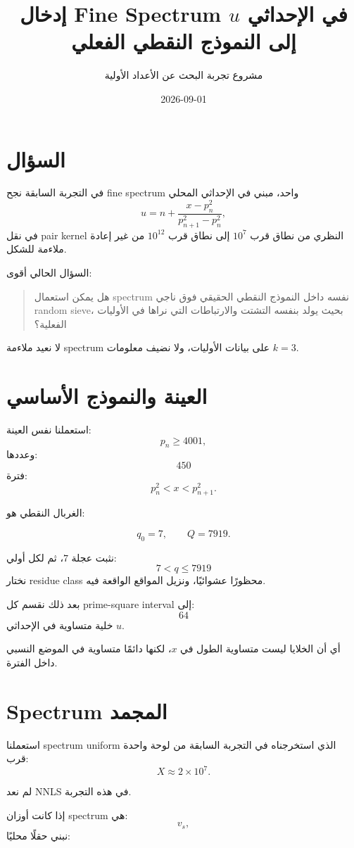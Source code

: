 \documentclass[12pt]{article}
\title{إدخال Fine Spectrum في الإحداثي \(u\) إلى النموذج النقطي الفعلي}
\author{مشروع تجربة البحث عن الأعداد الأولية}
\date{2026-09-01}
\begin{document}
\maketitle

\section{السؤال}

في التجربة السابقة نجح fine spectrum واحد، مبني في الإحداثي المحلي
\[
u
=
n+
\frac{x-p_n^2}
{p_{n+1}^2-p_n^2},
\]
في نقل pair kernel النظري من نطاق قرب \(10^7\) إلى نطاق قرب \(10^{12}\)
من غير إعادة ملاءمة للشكل.

السؤال الحالي أقوى:

\begin{quote}
هل يمكن استعمال spectrum نفسه داخل النموذج النقطي الحقيقي فوق ناجي
random sieve، بحيث يولد بنفسه التشتت والارتباطات التي نراها في
الأوليات الفعلية؟
\end{quote}

لا نعيد ملاءمة spectrum على بيانات الأوليات، ولا نضيف معلومات \(k=3\).

\section{العينة والنموذج الأساسي}

استعملنا نفس العينة:
\[
p_n\ge4001,
\]
وعددها:
\[
450
\]
فترة:
\[
p_n^2<x<p_{n+1}^2.
\]

الغربال النقطي هو:

\[
q_0=7,
\qquad
Q=7919.
\]

نثبت عجلة \(7\)، ثم لكل أولي:
\[
7<q\le7919
\]
نختار residue class محظورًا عشوائيًا، ونزيل المواقع الواقعة فيه.

بعد ذلك نقسم كل prime-square interval إلى:
\[
64
\]
خلية متساوية في الإحداثي \(u\).

أي أن الخلايا ليست متساوية الطول في \(x\)، لكنها دائمًا متساوية في
الموضع النسبي داخل الفترة.

\section{Spectrum المجمد}

استعملنا spectrum uniform الذي استخرجناه في التجربة السابقة من لوحة واحدة
قرب:
\[
X\approx2\times10^7.
\]

لم نعد NNLS في هذه التجربة.

إذا كانت أوزان spectrum هي:
\[
v_s,
\]
نبني حقلًا محليًا:
\end{document}
